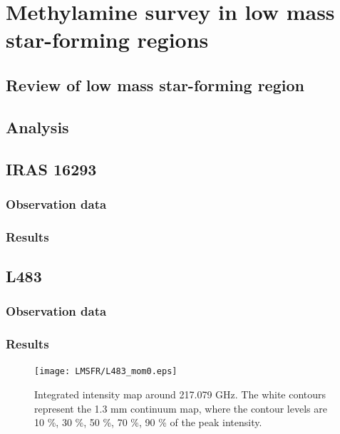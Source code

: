 \chapter{Methylamine survey in low mass star-forming regions
  \label{chap:LMSFRs}}

\section{Review of low mass star-forming region}
\section{Analysis}

\section{IRAS 16293}
\subsection{Observation data}
\subsection{Results}

\section{L483}
\subsection{Observation data}
\subsection{Results}

\begin{figure}[htbp]
  \centering
  \texttt{[image: LMSFR/L483\_mom0.eps]}
  \caption{Integrated intensity map around 217.079 GHz. The white contours represent the 1.3 mm continuum map, where the contour levels are 10 \%, 30 \%, 50 \%, 70 \%, 90 \% of the peak intensity.}
  \label{L483_mom0}
\end{figure}

